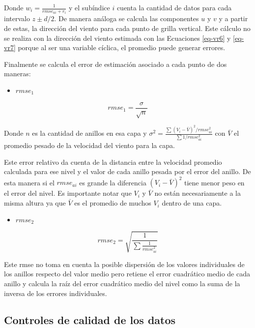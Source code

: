 \documentclass[12pt,spanish,oneside, a4paper]{book}
\providecommand{\tightlist}{%
  \setlength{\itemsep}{0pt}\setlength{\parskip}{0pt}}
\begin{document}
Donde \(w_i = \frac {1}{rmse_{ai} + r_i}\) y el subíndice \(i\) cuenta
la cantidad de datos para cada intervalo \(z \pm d/2\). De manera
análoga se calcula las componentes \(u\) y \(v\) y a partir de estas, la
dirección del viento para cada punto de grilla vertical. Este cálculo no
se realiza con la dirección del viento estimada con las Ecuaciones
\ref{eq-vr6} y \ref{eq-vr7} porque al ser una variable cíclica, el
promedio puede generar errores.

Finalmente se calcula el error de estimación asociado a cada punto de
dos maneras:

\begin{itemize}
\tightlist
\item
  \textbf{\(rmse_1\)}
\end{itemize}

\begin{equation}\label{eq-vr10} 
rmse_1 = \frac{\sigma}{\sqrt{n}}
\end{equation}

Donde \(n\) es la cantidad de anillos en esa capa y
\(\sigma^{2}= \frac{\sum (V_i - \bar{V})^2 /rmse_{ai}^2}{\sum 1/rmse_{ai}^2}\)
con \(\bar{V}\) el promedio pesado de la velocidad del viento para la
capa.

Este error relativo da cuenta de la distancia entre la velocidad
promedio calculada para ese nivel y el valor de cada anillo pesada por
el error del anillo. De esta manera si el \(rmse_{ai}\) es grande la
diferencia \((V_i - \bar{V})^2\) tiene menor peso en el error del nivel.
Es importante notar que \(V_i\) y \(\bar{V}\) no están necesariamente a
la misma altura ya que \(\bar{V}\) es el promedio de muchos \(V_i\)
dentro de una capa.

\begin{itemize}
\tightlist
\item
  \textbf{\(rmse_2\)}
\end{itemize}

\begin{equation}\label{eq-vr11}
rmse_2 = \sqrt{\frac{1}{\sum \frac{1}{rmse_{ai}^2}}}
\end{equation}

Este rmse no toma en cuenta la posible dispersión de los valores
individuales de los anillos respecto del valor medio pero retiene el
error cuadrático medio de cada anillo y calcula la raíz del error
cuadrático medio del nivel como la suma de la inversa de los errores
individuales.

\subsection{Controles de calidad de los
datos}\label{controles-de-calidad-de-los-datos}
\end{document}
